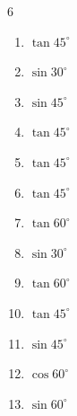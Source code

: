 \begin{multicols}{6}
\begin{enumerate}
  \item $\displaystyle \tan{45^\circ}$

        \phantom{$\displaystyle =1$}

  \item $\displaystyle \sin{30^\circ}$


  \item $\displaystyle \sin{45^\circ}$


  \item $\displaystyle \tan{45^\circ}$

        \phantom{$\displaystyle =1$}

  \item $\displaystyle \tan{45^\circ}$

        \phantom{$\displaystyle =1$}

  \item $\displaystyle \tan{45^\circ}$

        \phantom{$\displaystyle =1$}

  \item $\displaystyle \tan{60^\circ}$


  \item $\displaystyle \sin{30^\circ}$


  \item $\displaystyle \tan{60^\circ}$


\columnbreak %

\resetques

  \item $\displaystyle \tan{45^\circ}$

        \phantom{$\displaystyle =1$}

  \item $\displaystyle \sin{45^\circ}$


  \item $\displaystyle \cos{60^\circ}$


  \item $\displaystyle \sin{60^\circ}$


\end{enumerate}
\end{multicols}
